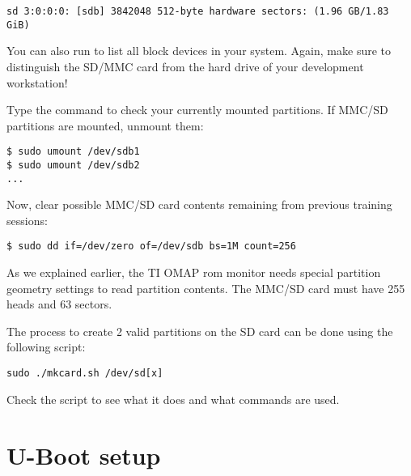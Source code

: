 \begin{verbatim}
sd 3:0:0:0: [sdb] 3842048 512-byte hardware sectors: (1.96 GB/1.83 GiB)
\end{verbatim}


You can also run  to list all block devices
in your system. Again, make sure to distinguish the SD/MMC card from the
hard drive of your development workstation!

Type the  command to check your currently mounted
partitions. If MMC/SD partitions are mounted, unmount them:

\begin{verbatim}
$ sudo umount /dev/sdb1
$ sudo umount /dev/sdb2
...
\end{verbatim}

Now, clear possible MMC/SD card contents remaining from previous training
sessions:

\begin{verbatim}
$ sudo dd if=/dev/zero of=/dev/sdb bs=1M count=256
\end{verbatim}

As we explained earlier, the TI OMAP rom monitor needs special partition geometry settings
to read partition contents. The MMC/SD card must have 255 heads and 63 sectors.

The process to create 2 valid partitions on the SD card can be done using the following script:
\begin{verbatim}
sudo ./mkcard.sh /dev/sd[x]
\end{verbatim}
Check the script to see what it does and what commands are used.


\section{U-Boot setup}

